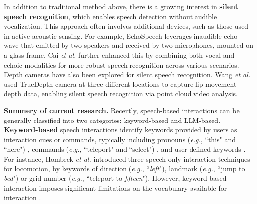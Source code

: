 \documentclass[review]{fcs}
\newcommand{\revise}[2]{\textcolor[rgb]{0,0,0}{#2}}
\begin{document}
In addition to traditional method above, there is a growing interest in \textbf{silent speech recognition}, which enables speech detection without audible vocalization. This approach often involves additional devices, such as those used in active acoustic sensing.
\revise{For example, EchoSpeech leverages inaudible echo wave that emitted by two speakers and received by two microphones, mounted on a glass-frame \cite{DBLP:conf/chi/ZhangLHWLGZ23}.}{For example, EchoSpeech\cite{DBLP:conf/chi/ZhangLHWLGZ23} leverages inaudible echo wave that emitted by two speakers and received by two microphones, mounted on a glass-frame.} 
\revise{Cai \textit{et al.} further enhanced this by combining both vocal and echoic modalities for more robust speech recognition across various scenarios \cite{DBLP:journals/tvcg/CaiML24}.}{Cai \textit{et al.} \cite{DBLP:journals/tvcg/CaiML24} further enhanced this by combining both vocal and echoic modalities for more robust speech recognition across various scenarios.}
Depth cameras have also been explored for silent speech recognition. 
\revise{Wang \textit{et al.} used TrueDepth camera at three different locations to capture lip movement depth data, enabling silent speech recognition via point cloud video analysis \cite{DBLP:conf/chi/WangSRZ24}.}{Wang \textit{et al.}\cite{DBLP:conf/chi/WangSRZ24} used TrueDepth camera at three different locations to capture lip movement depth data, enabling silent speech recognition via point cloud video analysis.}

\textbf{Summery of current research.} Recently, speech-based interactions can be generally classified into two categories: keyword-based and LLM-based. 
\textbf{Keyword-based} speech interactions identify keywords provided by users as interaction cues or commands, typically including pronouns (\textit{e.g.}, ``this" and ``here") \cite{DBLP:conf/vr/JingLB22}, commands (\textit{e.g.}, ``teleport" and ``select") \cite{DBLP:conf/vr/HombeckVHDL23, DBLP:conf/ismar/ChenGFCL23}, and user-defined keywords \cite{DBLP:conf/uist/LiaoKJKS22, DBLP:conf/chi/CaoKWAX24}. For instance, Hombeck \textit{et al.} \cite{DBLP:conf/vr/HombeckVHDL23} introduced three speech-only interaction techniques for locomotion, by keywords of direction (\textit{e.g.}, ``\textit{left}"), landmark (\textit{e.g.}, ``jump to \textit{bed}") or grid number (\textit{e.g.}, ``teleport to \textit{fifteen}"). However, keyword-based interaction imposes significant limitations on the vocabulary available for interaction \cite{DBLP:conf/vr/HombeckVHDL23}.
\end{document}

